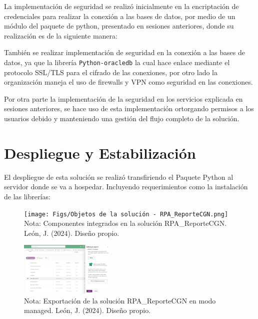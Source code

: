 \documentclass[letter,oneside,12pt,spanish]{report}
\begin{document}
\noindent La implementación de seguridad se realizó inicialmente en la encriptación de credenciales para realizar la conexión a las bases de datos, por medio de un módulo del paquete de python, presentado en sesiones anteriores, donde su realización es de la siguiente manera:


\noindent También se realizar implementación de seguridad en la conexión a las bases de datos, ya que la librería \texttt{Python-oracledb} la cual hace enlace mediante el protocolo SSL/TLS para el cifrado de las conexiones, por otro lado la organización maneja el uso de firewalls y VPN como seguridad en las conexiones.

\noindent Por otra parte la implementación de la seguridad en los servicios explicada en sesiones anteriores, se hace uso de esta implementación ortorgando permisos a los usuarios debido y manteniendo una gestión del flujo completo de la solución.


\section{Despliegue y Estabilización}

\noindent El despliegue de esta solución se realizó transfiriendo el Paquete Python al servidor donde se va a hospedar. Incluyendo requerimientos como la instalación de las librerías:

\begin{figure}[ht]
    \centering
    \texttt{[image: Figs/Objetos de la solución - RPA\_ReporteCGN.png]}
    \label{fig:ComponentSolution}
    \\Nota: Componentes integrados en la solución RPA\_ReporteCGN. León, J. (2024). Diseño propio.
\end{figure}

\begin{figure}[ht]
    \centering
    \includegraphics[width=0.4\textwidth]{Figs/Exportación Solución - RPA_ReporteCGN.png}
    \label{fig:ExportationSolution}
    \\Nota: Exportación de la solución RPA\_ReporteCGN en modo managed. León, J. (2024). Diseño propio.
\end{figure}
\end{document}
